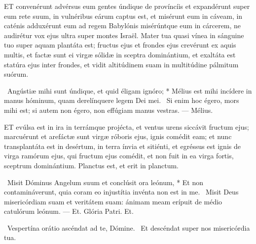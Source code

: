 \lettrine[lines=2]{E}{T} convenérunt advérsus eum gentes úndique de províncíis et expandérunt super eum rete suum, in vulnéribus eárum captus est, et misérunt eum in cáveam, in caténis adduxérunt eum ad regem Babylónis misérúntque eum in cárcerem, ne audirétur vox ejus ultra super montes Israël. Mater tua quasi vínea in sánguine tuo super aquam plantáta est; fructus ejus et frondes ejus crevérunt ex aquis multis, et factæ sunt ei virgæ sólidæ in sceptra dominántium, et exaltáta est statúra ejus inter frondes, et vidit altitúdinem suam in multitúdine pálmitum suórum.

\R\ Angústiæ mihi sunt úndique, et quid éligam ignóro; * Mélius est mihi incídere in manus hóminum, quam derelínquere legem Dei mei. \V\ Si enim hoc égero, mors mihi est; si autem non égero, non effúgiam manus vestras. — Mélius.



\lettrine[lines=2]{E}{T} evúlsa est in ira in terrámque projécta, et ventus urens siccávit fructum ejus; marcuérunt et arefáctæ sunt virgæ róboris ejus, ignis comédit eam; et nunc transplantáta est in desértum, in terra ínvia et sitiénti, et egréssus est ignis de virga ramórum ejus, qui fructum ejus comédit, et non fuit in ea virga fortis, sceptrum dominántium. Planctus est, et erit in planctum.

\R\ Misit Dóminus Angelum suum et conclúsit ora leónum, * Et non contamináverunt, quia coram eo injustítia invénta non est in me. \V\ Misit Deus misericórdiam suam et veritátem suam: ánimam meam erípuit de médio catulórum leónum. — Et. Glória Patri. Et.




\V\ Vespertína orátio ascéndat ad te, Dómine. \R\ Et descéndat super nos misericórdia tua.

